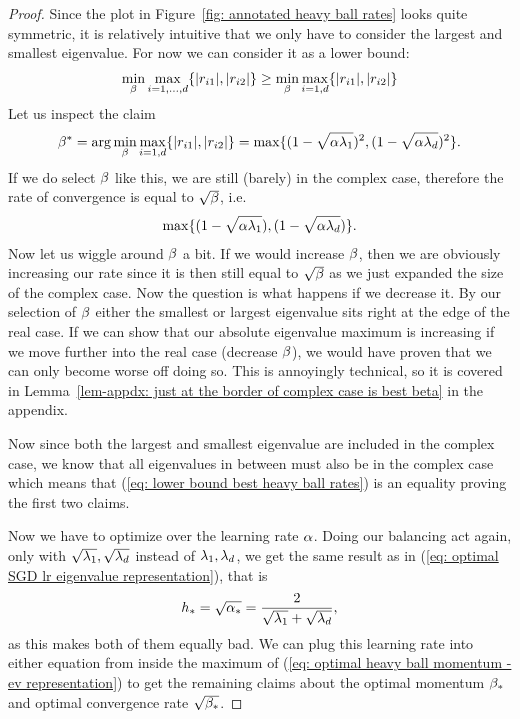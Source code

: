 \begin{proof}
	Since the plot in Figure~\ref{fig: annotated heavy ball rates} looks quite
	symmetric, it is relatively intuitive that we only have to consider the largest and
	smallest eigenvalue. For now we can consider it as a lower bound:
	\begin{align}\label{eq: lower bound best heavy ball rates}
		\min_{\beta}\max_{i=1,\dots,d}\{|r_{i1}|,|r_{i2}|\}
		\ge \min_{\beta}
		\max_{i=1,d}\{|r_{i1}|,|r_{i2}|\}
	\end{align}
	Let us inspect the claim
	\begin{align}\label{eq: optimal heavy ball momentum - ev representation}
		\beta^*=\arg\min_{\beta}\max_{i=1,d}\{|r_{i1}|,|r_{i2}|\}
		= \max\{(1-\sqrt{\alpha\lambda_1})^2, (1-\sqrt{\alpha\lambda_d})^2\}.
	\end{align}
	If we do select \(\beta\) like this, we are still (barely) in the complex
	case, therefore the rate of convergence is equal to \(\sqrt{\beta}\),
	i.e.
	\begin{align*}
		\max\{(1-\sqrt{\alpha\lambda_1}), (1-\sqrt{\alpha\lambda_d})\}.
	\end{align*}
	Now let us wiggle around \(\beta\) a bit. If we would increase
	\(\beta\), then we are obviously increasing our rate since it is then
	still equal to \(\sqrt{\beta}\) as we just expanded the size of the
	complex case. Now the question is what happens if we decrease it. By our
	selection of \(\beta\) either the smallest or largest eigenvalue sits
	right at the edge of the real case. If we can show that our absolute
	eigenvalue maximum is increasing if we move further into the real case
	(decrease \(\beta\)), we would have proven that we can only become worse
	off doing so. This is annoyingly technical, so it is covered in
	Lemma~\ref{lem-appdx: just at the border of complex case is best beta} in the
	appendix.

	Now since both the largest and smallest eigenvalue are included in the complex
	case, we know that all eigenvalues in between must also be in the complex case
	which means that (\ref{eq: lower bound best heavy ball rates}) is an equality
	proving the first two claims.

	Now we have to optimize over the learning rate \(\alpha\). Doing our balancing
	act again, only with \(\sqrt{\lambda_1},\sqrt{\lambda_d}\) instead
	of \(\lambda_1,\lambda_d\), we get the same result as in
	(\ref{eq: optimal SGD lr eigenvalue representation}), that is 
	\begin{align*}
		h_* = \sqrt{\alpha_*} = \frac{2}{\sqrt{\lambda_1}+\sqrt{\lambda_d}},
	\end{align*}
	as this makes both of them equally bad. We can plug this learning rate into
	either equation from inside the maximum of (\ref{eq: optimal heavy ball
	momentum - ev representation}) to get the remaining claims about the optimal
	momentum \(\beta_*\) and optimal convergence rate \(\sqrt{\beta_*}\).
\end{proof}

